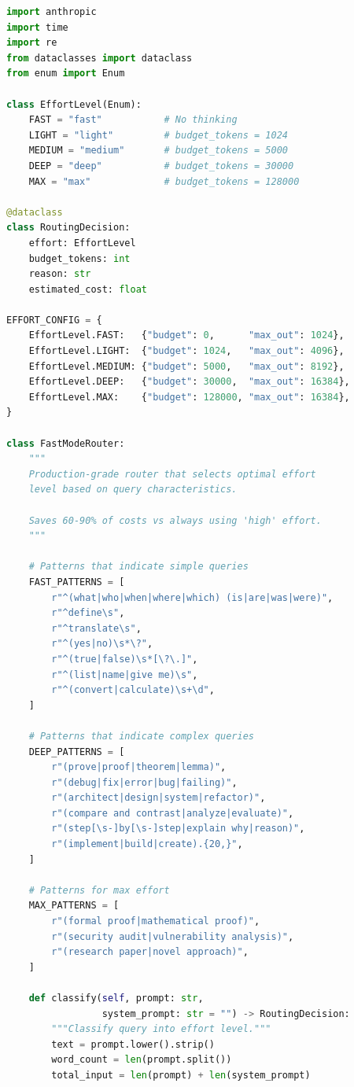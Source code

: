 \documentclass[11pt,a4paper]{article}
\begin{document}
\begin{lstlisting}[language=Python, caption={Production Fast Mode Router with Cost Tracking}]
import anthropic
import time
import re
from dataclasses import dataclass
from enum import Enum

class EffortLevel(Enum):
    FAST = "fast"           # No thinking
    LIGHT = "light"         # budget_tokens = 1024
    MEDIUM = "medium"       # budget_tokens = 5000
    DEEP = "deep"           # budget_tokens = 30000
    MAX = "max"             # budget_tokens = 128000

@dataclass
class RoutingDecision:
    effort: EffortLevel
    budget_tokens: int
    reason: str
    estimated_cost: float

EFFORT_CONFIG = {
    EffortLevel.FAST:   {"budget": 0,      "max_out": 1024},
    EffortLevel.LIGHT:  {"budget": 1024,   "max_out": 4096},
    EffortLevel.MEDIUM: {"budget": 5000,   "max_out": 8192},
    EffortLevel.DEEP:   {"budget": 30000,  "max_out": 16384},
    EffortLevel.MAX:    {"budget": 128000, "max_out": 16384},
}

class FastModeRouter:
    """
    Production-grade router that selects optimal effort
    level based on query characteristics.
    
    Saves 60-90% of costs vs always using 'high' effort.
    """
    
    # Patterns that indicate simple queries
    FAST_PATTERNS = [
        r"^(what|who|when|where|which) (is|are|was|were)",
        r"^define\s",
        r"^translate\s",
        r"^(yes|no)\s*\?",
        r"^(true|false)\s*[\?\.]",
        r"^(list|name|give me)\s",
        r"^(convert|calculate)\s+\d",
    ]
    
    # Patterns that indicate complex queries
    DEEP_PATTERNS = [
        r"(prove|proof|theorem|lemma)",
        r"(debug|fix|error|bug|failing)",
        r"(architect|design|system|refactor)",
        r"(compare and contrast|analyze|evaluate)",
        r"(step[\s-]by[\s-]step|explain why|reason)",
        r"(implement|build|create).{20,}",
    ]
    
    # Patterns for max effort
    MAX_PATTERNS = [
        r"(formal proof|mathematical proof)",
        r"(security audit|vulnerability analysis)",
        r"(research paper|novel approach)",
    ]
    
    def classify(self, prompt: str, 
                 system_prompt: str = "") -> RoutingDecision:
        """Classify query into effort level."""
        text = prompt.lower().strip()
        word_count = len(prompt.split())
        total_input = len(prompt) + len(system_prompt)
        

\end{lstlisting}
\end{document}
